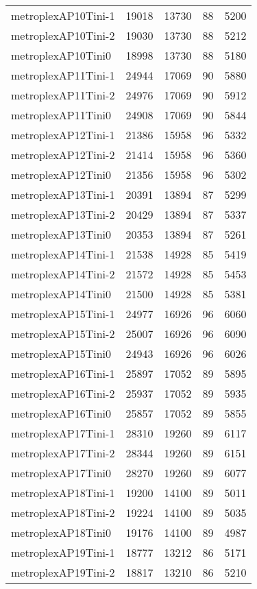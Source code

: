 \begin{longtable}{lrrrr}
metroplexAP10Tini-1 & 19018 & 13730 & 88 & 5200 \\
metroplexAP10Tini-2 & 19030 & 13730 & 88 & 5212 \\
metroplexAP10Tini0 & 18998 & 13730 & 88 & 5180 \\
metroplexAP11Tini-1 & 24944 & 17069 & 90 & 5880 \\
metroplexAP11Tini-2 & 24976 & 17069 & 90 & 5912 \\
metroplexAP11Tini0 & 24908 & 17069 & 90 & 5844 \\
metroplexAP12Tini-1 & 21386 & 15958 & 96 & 5332 \\
metroplexAP12Tini-2 & 21414 & 15958 & 96 & 5360 \\
metroplexAP12Tini0 & 21356 & 15958 & 96 & 5302 \\
metroplexAP13Tini-1 & 20391 & 13894 & 87 & 5299 \\
metroplexAP13Tini-2 & 20429 & 13894 & 87 & 5337 \\
metroplexAP13Tini0 & 20353 & 13894 & 87 & 5261 \\
metroplexAP14Tini-1 & 21538 & 14928 & 85 & 5419 \\
metroplexAP14Tini-2 & 21572 & 14928 & 85 & 5453 \\
metroplexAP14Tini0 & 21500 & 14928 & 85 & 5381 \\
metroplexAP15Tini-1 & 24977 & 16926 & 96 & 6060 \\
metroplexAP15Tini-2 & 25007 & 16926 & 96 & 6090 \\
metroplexAP15Tini0 & 24943 & 16926 & 96 & 6026 \\
metroplexAP16Tini-1 & 25897 & 17052 & 89 & 5895 \\
metroplexAP16Tini-2 & 25937 & 17052 & 89 & 5935 \\
metroplexAP16Tini0 & 25857 & 17052 & 89 & 5855 \\
metroplexAP17Tini-1 & 28310 & 19260 & 89 & 6117 \\
metroplexAP17Tini-2 & 28344 & 19260 & 89 & 6151 \\
metroplexAP17Tini0 & 28270 & 19260 & 89 & 6077 \\
metroplexAP18Tini-1 & 19200 & 14100 & 89 & 5011 \\
metroplexAP18Tini-2 & 19224 & 14100 & 89 & 5035 \\
metroplexAP18Tini0 & 19176 & 14100 & 89 & 4987 \\
metroplexAP19Tini-1 & 18777 & 13212 & 86 & 5171 \\
metroplexAP19Tini-2 & 18817 & 13210 & 86 & 5210 \\

\end{longtable}
